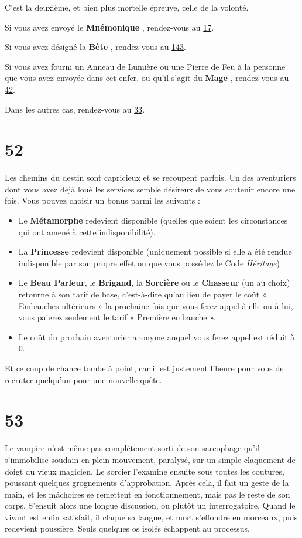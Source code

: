 \documentclass{report}
\newcommand{\gsection}[1]{
    \section{#1}
    \label{section-#1}
}
\newcommand{\glink}[1]{\hyperref[section-#1]{#1}}
\newcommand{\hero}[1]{
    \textbf{#1}
}
\begin{document}
C'est la deuxième, et bien plus mortelle épreuve, celle de la volonté.

Si vous avez envoyé le \hero{Mnémonique}, rendez-vous au \glink{17}.

Si vous avez désigné la \hero{Bête}, rendez-vous au \glink{143}.

Si vous avez fourni un Anneau de Lumière ou une Pierre de Feu à la personne que vous avez envoyée dans cet enfer, ou qu'il s'agit du \hero{Mage}, rendez-vous au \glink{42}.

Dans les autres cas, rendez-vous au \glink{33}.

\gsection{52}

Les chemins du destin sont capricieux et se recoupent parfois. Un des aventuriers dont vous avez déjà loué les services semble désireux de vous soutenir encore une fois. Vous pouvez choisir un bonus parmi les suivants :

\begin{itemize}
\item Le \hero{Métamorphe} redevient disponible (quelles que soient les circonstances qui ont amené à cette indisponibilité).
\item La \hero{Princesse} redevient disponible (uniquement possible si elle a été rendue indisponible par son propre effet ou que vous possédez le Code \emph{Héritage})
\item Le \textbf{Beau Parleur}, le \textbf{Brigand}, la \textbf{Sorcière} ou le \textbf{Chasseur} (un au choix) retourne à son tarif de base, c'est-à-dire qu'au lieu de payer le coût « Embauches ultérieurs » la prochaine fois que vous ferez appel à elle ou à lui, vous paierez seulement le tarif « Première embauche ».
\item Le coût du prochain aventurier anonyme auquel vous ferez appel est réduit à 0.
\end{itemize}

Et ce coup de chance tombe à point, car il est justement l'heure pour vous de recruter quelqu'un pour une nouvelle quête.

\gsection{53}

Le vampire n'est même pas complètement sorti de son sarcophage qu'il s'immobilise soudain en plein mouvement, paralysé, sur un simple claquement de doigt du vieux magicien. Le sorcier l'examine ensuite sous toutes les coutures, poussant quelques grognements d'approbation. Après cela, il fait un geste de la main, et les mâchoires se remettent en fonctionnement, mais pas le reste de son corps. S'ensuit alors une longue discussion, ou plutôt un interrogatoire. Quand le vivant est enfin satisfait, il claque sa langue, et mort s'effondre en morceaux, puis redevient poussière. Seuls quelques os isolés échappent au processus.
\end{document}
